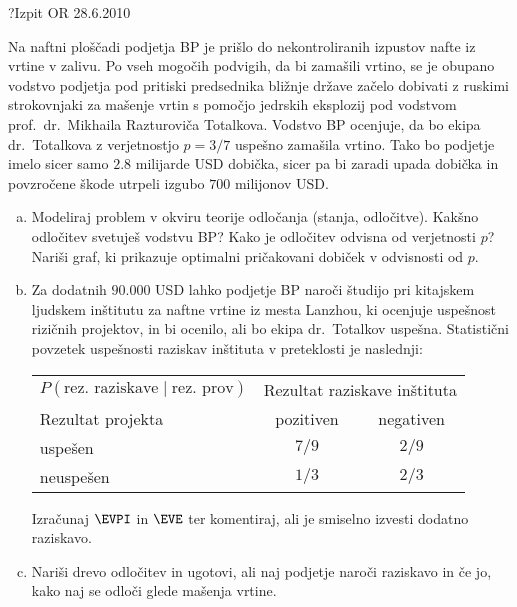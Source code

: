 \begin{naloga}{?}{Izpit OR 28.6.2010}
\begin{vprasanje}
Na naftni ploščadi podjetja BP
je prišlo do nekontroliranih izpustov nafte iz vrtine v zalivu.
Po vseh mogočih podvigih, da bi zamašili vrtino,
se je ob\-upa\-no vodstvo podjetja pod pritiski predsednika bližnje države
začelo dobivati z ruskimi strokovnjaki
za mašenje vrtin s pomočjo jedrskih eksplozij pod vodstvom
prof.~dr.~Mikhaila Razturoviča Totalkova.
Vodstvo BP ocenjuje, da bo ekipa dr.~Totalkova
z verjetnostjo $p = 3/7$ uspešno zamašila vrtino.
Tako bo podjetje imelo sicer samo $2.8$ milijarde USD dobička,
sicer pa bi zaradi upada dobička in povzročene škode
utrpeli izgubo $700$ milijonov USD.

\begin{enumerate}[(a)]
\item Modeliraj problem v okviru teorije odločanja (stanja, odločitve).
Kakšno odločitev svetuješ vodstvu BP?
Kako je odločitev odvisna od verjetnosti $p$?
Nariši graf, ki prikazuje optimalni pričakovani dobiček v odvisnosti od $p$.

\item Za dodatnih $90.000$ USD lahko podjetje BP naroči študijo
pri kitajskem ljudskem inštitutu za naftne vrtine iz mesta Lanzhou,
ki ocenjuje uspešnost rizičnih projektov,
in bi ocenilo, ali bo ekipa dr.~Totalkov uspešna.
Statistični povzetek uspešnosti raziskav inštituta v preteklosti je naslednji:
\begin{center}
\begin{tabular}{l|cc}
$P(\text{rez.~raziskave} \;|\; \text{rez.~prov})$ &
\multicolumn{2}{c}{Rezultat raziskave inštituta} \\
Rezultat projekta & pozitiven & negativen \\ \hline
uspešen   &  $7/9$ & $2/9$ \\
neuspešen &  $1/3$ & $2/3$
\end{tabular}
\end{center}
Izračunaj $\EVPI$ in $\EVE$ ter komentiraj,
ali je smiselno izvesti dodatno raz\-iska\-vo.

\item Nariši drevo odločitev in ugotovi,
ali naj podjetje naroči raziskavo in če jo,
kako naj se odloči glede mašenja vrtine.
\end{enumerate}
\end{vprasanje}
\begin{odgovor}
\end{odgovor}
\end{naloga}
